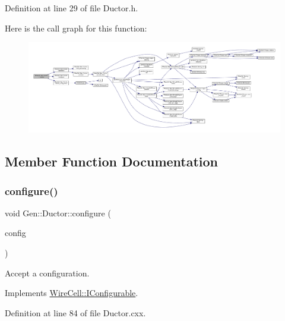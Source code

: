Definition at line 29 of file Ductor.\+h.

Here is the call graph for this function\+:
\nopagebreak
\begin{figure}[H]
\begin{center}
\leavevmode
\includegraphics[width=350pt]{class_wire_cell_1_1_gen_1_1_ductor_a331c4314dba8472ab8c49dbc9112ff4b_cgraph}
\end{center}
\end{figure}


\subsection{Member Function Documentation}
\mbox{\label{class_wire_cell_1_1_gen_1_1_ductor_a2e5f7a0246fe8918d7b241a8be8e1917}} 
\subsubsection{\texorpdfstring{configure()}{configure()}}
{\footnotesize\ttfamily void Gen\+::\+Ductor\+::configure (\begin{DoxyParamCaption}\item[{const \hyperlink{namespace_wire_cell_a9f705541fc1d46c608b3d32c182333ee}{Wire\+Cell\+::\+Configuration} \&}]{config }\end{DoxyParamCaption})\hspace{0.3cm}{\ttfamily [virtual]}}



Accept a configuration. 



Implements \hyperlink{class_wire_cell_1_1_i_configurable_a57ff687923a724093df3de59c6ff237d}{Wire\+Cell\+::\+I\+Configurable}.



Definition at line 84 of file Ductor.\+cxx.

